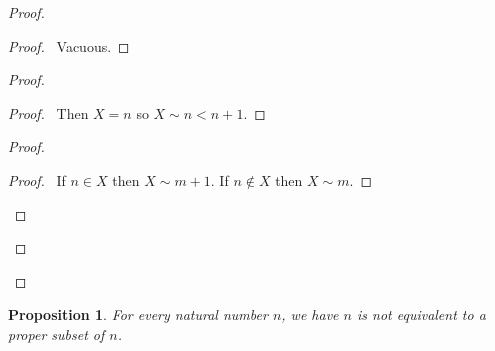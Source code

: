 \documentclass{report}
\let\qed\relax
\newtheorem{prop}[ax]{Proposition}
\theoremstyle{definition}
\begin{document}
\begin{proof}
\pf
{}
\begin{proof}
	\pf\ Vacuous.
\end{proof}
\begin{proof}
	\begin{proof}
		\pf\ Then $X = n$ so $X \sim n < n+1$.
	\end{proof}
	\begin{proof}
		\begin{proof}
			\pf\ If $n \in X$ then $X \sim m + 1$. If $n \notin X$ then $X \sim m$.
		\end{proof}
	\end{proof}
\end{proof}
\qed
\end{proof}

\begin{prop}
\label{prop:pigeonhole}
For every natural number $n$, we have $n$ is not equivalent to a proper subset of $n$.
\end{prop}
\end{document}

